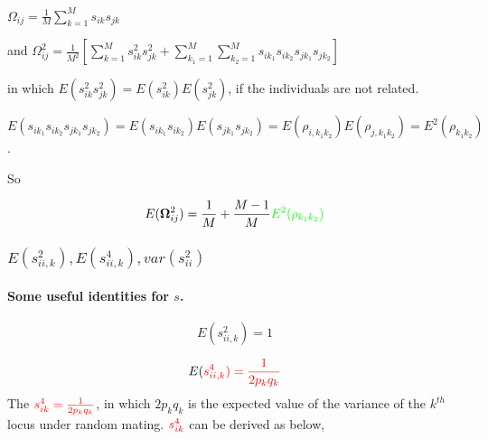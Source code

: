 \documentclass[]{article}
\let\oldparagraph\paragraph
\renewcommand{\paragraph}[1]{\oldparagraph{#1}\mbox{}}
\begin{document}
\(\Omega_{ij}=\frac{1}{M}\sum_{k=1}^Ms_{ik}s_{jk}\)

and
\(\Omega_{ij}^2=\frac{1}{M^2}[\sum_{k=1}^Ms^2_{ik}s^2_{jk}+\sum_{k_1=1}^M\sum_{k_2=1}^Ms_{ik_1}s_{ik_2}s_{jk_1}s_{jk_2}]\)

in which \(E(s_{ik}^2s_{jk}^2)=E(s_{ik}^2)E(s_{jk}^2)\), if the
individuals are not related.

\(E(s_{ik_1}s_{ik_2}s_{jk_1}s_{jk_2})=E(s_{ik_1}s_{ik_2})E(s_{jk_1}s_{jk_2})=E(\rho_{i,k_1k_2})E(\rho_{j,k_1k_2})=E^2(\rho_{k_1k_2})\).

So

\[E(\mathbf{\Omega}_{ij}^2)=\frac{1}{M}+\frac{M-1}{M}\color{green}{E^2(\rho_{k_1k_2})}\]

\hypertarget{es2_iikes4_iik-vars_ii2}{%
\subsubsection{\texorpdfstring{\(E(s^2_{ii,k}),E(s^4_{ii,k}), var(s_{ii}^2)\)}{E(s\^{}2\_\{ii,k\}),E(s\^{}4\_\{ii,k\}), var(s\_\{ii\}\^{}2)}}\label{es2_iikes4_iik-vars_ii2}}

\hypertarget{some-useful-identities-for-s.}{%
\paragraph{\texorpdfstring{Some useful identities for
\(s\).}{Some useful identities for s.}}\label{some-useful-identities-for-s.}}

\[E(s^2_{ii,k})=1\]

\[E(\color{red} {s^4_{ii,k}})=\frac{1}{2p_kq_k}\] The
\(\color{red} {s^4_{ik} = \frac{1}{2p_kq_k}}\), in which \(2p_kq_k\) is
the expected value of the variance of the \(k^{th}\) locus under random
mating. \(\color{red} {s^4_{ik}}\) can be derived as below,
\end{document}
